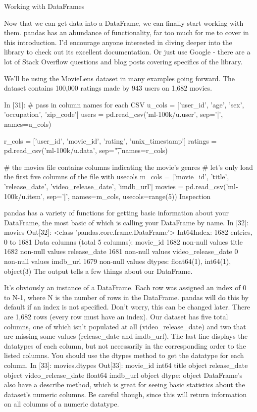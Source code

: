 
Working with DataFrames

Now that we can get data into a DataFrame, we can finally start working with them. pandas has an abundance of functionality, far too much for me to cover in this introduction. I'd encourage anyone interested in diving deeper into the library to check out its excellent documentation. Or just use Google - there are a lot of Stack Overflow questions and blog posts covering specifics of the library.

We'll be using the MovieLens dataset in many examples going forward. The dataset contains 100,000 ratings made by 943 users on 1,682 movies.


In [31]:
# pass in column names for each CSV
u_cols = ['user_id', 'age', 'sex', 'occupation', 'zip_code']
users = pd.read_csv('ml-100k/u.user', sep='|', names=u_cols)

r_cols = ['user_id', 'movie_id', 'rating', 'unix_timestamp']
ratings = pd.read_csv('ml-100k/u.data', sep='\t', names=r_cols)

# the movies file contains columns indicating the movie's genres
# let's only load the first five columns of the file with usecols
m_cols = ['movie_id', 'title', 'release_date', 'video_release_date', 'imdb_url']
movies = pd.read_csv('ml-100k/u.item', sep='|', names=m_cols, usecols=range(5))
Inspection

pandas has a variety of functions for getting basic information about your DataFrame, the most basic of which is calling your DataFrame by name.
In [32]:
movies
Out[32]:
<class 'pandas.core.frame.DataFrame'>
Int64Index: 1682 entries, 0 to 1681
Data columns (total 5 columns):
movie_id              1682  non-null values
title                 1682  non-null values
release_date          1681  non-null values
video_release_date    0  non-null values
imdb_url              1679  non-null values
dtypes: float64(1), int64(1), object(3)
The output tells a few things about our DataFrame.

It's obviously an instance of a DataFrame.
Each row was assigned an index of 0 to N-1, where N is the number of rows in the DataFrame. pandas will do this by default if an index is not specified. Don't worry, this can be changed later.
There are 1,682 rows (every row must have an index).
Our dataset has five total columns, one of which isn't populated at all (video_release_date) and two that are missing some values (release_date and imdb_url).
The last line displays the datatypes of each column, but not necessarily in the corresponding order to the listed columns. You should use the dtypes method to get the datatype for each column.
In [33]:
movies.dtypes
Out[33]:
movie_id                int64
title                  object
release_date           object
video_release_date    float64
imdb_url               object
dtype: object
DataFrame's also have a describe method, which is great for seeing basic statistics about the dataset's numeric columns. Be careful though, since this will return information on all columns of a numeric datatype.

